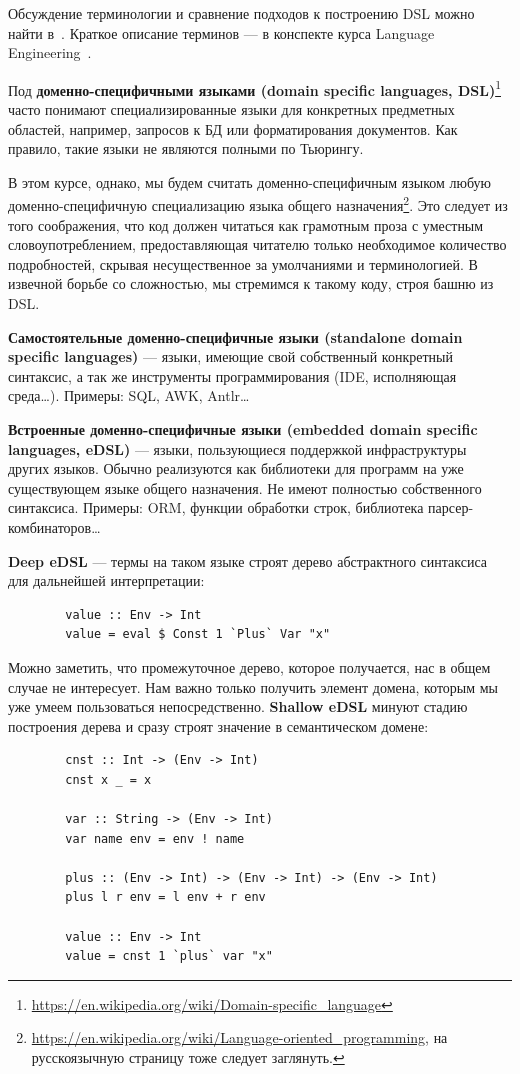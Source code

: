 \documentclass[12pt]{article}
\newcommand{\vocab}[1]{\textbf{#1}} %
\begin{document}
    Обсуждение терминологии и сравнение подходов к построению DSL можно найти в~\cite{gibbons2013functional}.
    Краткое описание терминов --- в конспекте курса Language Engineering~\cite{languageEngineering}.

    Под \vocab{доменно-специфичными языками (domain specific languages, DSL)}\footnote{\url{https://en.wikipedia.org/wiki/Domain-specific_language}} часто понимают специализированные языки для конкретных предметных областей, например, запросов к БД или форматирования документов.
    Как правило, такие языки не являются полными по Тьюрингу.

    В этом курсе, однако, мы будем считать доменно-специфичным языком любую доменно-специфичную специализацию языка общего назначения\footnote{\url{https://en.wikipedia.org/wiki/Language-oriented_programming}, на русскоязычную страницу тоже следует заглянуть.}.
    Это следует из того соображения, что код должен читаться как грамотным проза с уместным словоупотреблением, предоставляющая читателю только необходимое количество подробностей, скрывая несущественное за умолчаниями и терминологией.
    В извечной борьбе со сложностью, мы стремимся к такому коду, строя башню из DSL\@.

    \vocab{Самостоятельные доменно-специфичные языки (standalone domain specific languages)} --- языки, имеющие свой собственный конкретный синтаксис, а так же инструменты программирования (IDE, исполняющая среда\ldots).
    Примеры: SQL, AWK, Antlr\ldots

    \vocab{Встроенные доменно-специфичные языки (embedded domain specific languages, eDSL)} --- языки, пользующиеся поддержкой инфраструктуры других языков.
    Обычно реализуются как библиотеки для программ на уже существующем языке общего назначения.
    Не имеют полностью собственного синтаксиса.
    Примеры: ORM, функции обработки строк, библиотека парсер-комбинаторов\ldots

    \vocab{Deep eDSL} --- термы на таком языке строят дерево абстрактного синтаксиса для дальнейшей интерпретации:
    \begin{verbatim}
        value :: Env -> Int
        value = eval $ Const 1 `Plus` Var "x"
    \end{verbatim}

    Можно заметить, что промежуточное дерево, которое получается, нас в общем случае не интересует.
    Нам важно только получить элемент домена, которым мы уже умеем пользоваться непосредственно.
    \vocab{Shallow eDSL} минуют стадию построения дерева и сразу строят значение в семантическом домене:
    \begin{verbatim}
        cnst :: Int -> (Env -> Int)
        cnst x _ = x

        var :: String -> (Env -> Int)
        var name env = env ! name

        plus :: (Env -> Int) -> (Env -> Int) -> (Env -> Int)
        plus l r env = l env + r env

        value :: Env -> Int
        value = cnst 1 `plus` var "x"
    \end{verbatim}
\end{document}
